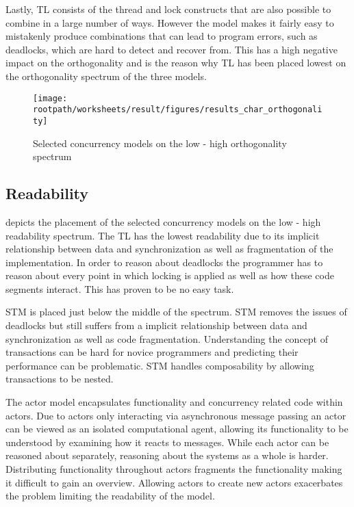 Lastly, \ac{TL} consists of the thread and lock constructs that are also possible to combine in a large number of ways. However the model makes it fairly easy to mistakenly produce combinations that can lead to program errors, such as deadlocks, which are hard to detect and recover from. This has a high negative impact on the orthogonality and is the reason why \ac{TL} has been placed lowest on the orthogonality spectrum of the three models.

\begin{figure}[htbp]
\centering
 \texttt{[image: \\rootpath/worksheets/result/figures/results\_char\_orthogonality]} 
 \caption{Selected concurrency models on the low - high orthogonality spectrum}
\label{fig:results_char_orthogonality}
\end{figure}

\subsection{Readability}\label{sec:result_char_readability}
 depicts the placement of the selected concurrency models on the low - high readability spectrum. The \ac{TL} has the lowest readability due to its implicit relationship between data and synchronization as well as fragmentation of the implementation. In order to reason about deadlocks the programmer has to reason about every point in which locking is applied as well as how these code segments interact. This has proven to be no easy task.

\ac{STM} is placed just below the middle of the spectrum. \ac{STM} removes the issues of deadlocks but still suffers from a implicit relationship between data and synchronization as well as code fragmentation. Understanding the concept of transactions can be hard for novice programmers and predicting their performance can be problematic. \ac{STM} handles composability by allowing transactions to be nested. 

The actor model encapsulates functionality and concurrency related code within actors. Due to actors only interacting via asynchronous message passing an actor can be viewed as an isolated computational agent, allowing its functionality to be understood by examining how it reacts to messages. While each actor can be reasoned about separately, reasoning about the systems as a whole is harder. Distributing functionality throughout actors fragments the functionality making it difficult to gain an overview. Allowing actors to create new actors exacerbates the problem limiting the readability of the model.

